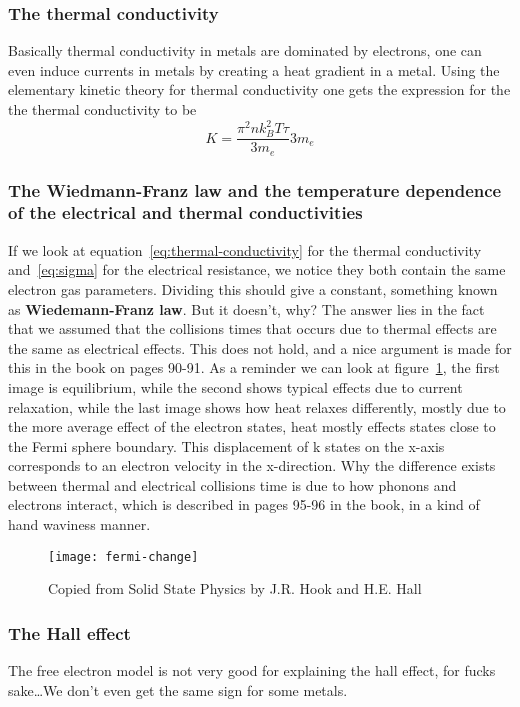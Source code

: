 \documentclass[11pt]{article}
\begin{document}
\subsubsection{The thermal conductivity}
Basically thermal conductivity in metals are dominated by electrons, one can even induce currents in metals by creating a heat gradient in a metal. Using the elementary kinetic theory for thermal conductivity one gets the expression for the the thermal conductivity to be
\begin{equation}
K = \frac{\pi^2 nk_B^2 T \tau}{3m_e}{3m_e}
\label{eq:thermal-conductivity}
\end{equation}

\subsubsection{The Wiedmann-Franz law and the temperature dependence of the electrical and thermal conductivities}
If we look at equation~\ref{eq:thermal-conductivity} for the thermal conductivity and~\ref{eq:sigma} for the electrical resistance, we notice they both contain the same electron gas parameters. Dividing this should give a constant, something known as \textbf{Wiedemann-Franz law}. But it doesn't, why? The answer lies in the fact that we assumed that the collisions times that occurs due to thermal effects are the same as electrical effects. This does not hold, and a nice argument is made for this in the book on pages 90-91. As a reminder we can look at figure~\ref{fig:fermi-change}, the first image is equilibrium, while the second shows typical effects due to current relaxation, while the last image shows how heat relaxes differently, mostly due to the more average effect of the electron states, heat mostly effects states close to the Fermi sphere boundary. This displacement of k states on the x-axis corresponds to an electron velocity in the x-direction. Why the difference exists between thermal and electrical collisions time is due to how phonons and electrons interact, which is described in pages 95-96 in the book, in a kind of hand waviness manner. 
\begin{figure}[!ht]
	\centering
	\texttt{[image: fermi-change]}
	\caption{Copied from Solid State Physics by J.R. Hook and H.E. Hall}
	\label{fig:fermi-change}
\end{figure}

\subsubsection{The Hall effect}
The free electron model is not very good for explaining the hall effect, for fucks sake\ldots We don't even get the same sign for some metals. 
\end{document}
